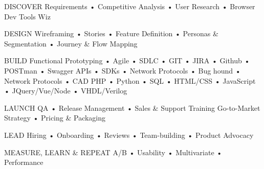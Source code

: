 

\begin{cvskills}

  \cvskill
    {DISCOVER} %
    {Requirements • Competitive Analysis • User Research • Browser Dev Tools Wiz} %

  \cvskill
    {DESIGN} %
    {Wireframing • Stories • Feature Definition • Personas \& Segmentation • Journey \& Flow Mapping} %

  \cvskill
    {BUILD} %
    {Functional Prototyping • Agile • SDLC • GIT • JIRA • Github • POSTman • Swagger \newline
    APIs • SDKs • Network Protocols • Bug hound • Network Protocols • CAD \newline
    PHP • Python • SQL • HTML/CSS • JavaScript • JQuery/Vue/Node • VHDL/Verilog} %

  \cvskill
    {LAUNCH} %
    {QA • Release Management • Sales \& Support Training \newline
    Go-to-Market Strategy • Pricing \& Packaging } %

  \cvskill
    {LEAD} %
    {Hiring • Onboarding • Reviews • Team-building • Product Advocacy} %

  \cvskill
    {MEASURE, LEARN \& REPEAT} %
    {A/B • Usability • Multivariate • Performance} %

\end{cvskills}
